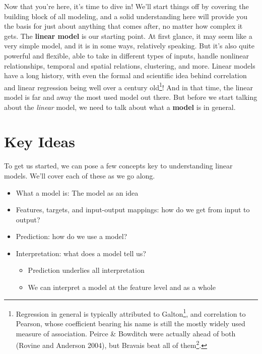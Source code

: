 \documentclass[
  letterpaper,
]{krantz}
\providecommand{\tightlist}{%
  \setlength{\itemsep}{0pt}\setlength{\parskip}{0pt}}\usepackage{longtable,booktabs,array}
\DeclareRobustCommand{\href}[2]{#2\footnote{\url{#1}}}
\begin{document}
Now that you're here, it's time to dive in! We'll start things off by
covering the building block of all modeling, and a solid understanding
here will provide you the basis for just about anything that comes
after, no matter how complex it gets. The \textbf{linear model} is our
starting point. At first glance, it may seem like a very simple model,
and it is in some ways, relatively speaking. But it's also quite
powerful and flexible, able to take in different types of inputs, handle
nonlinear relationships, temporal and spatial relations, clustering, and
more. Linear models have a long history, with even the formal and
scientific idea behind correlation and linear regression being well over
a century old\footnote{Regression in general is typically attributed to
  \href{https://en.wikipedia.org/wiki/Francis_Galton}{Galton}, and
  correlation to Pearson, whose coefficient bearing his name is still
  the mostly widely used measure of association. Peirce \& Bowditch were
  actually ahead of both (Rovine and Anderson 2004), but
  \href{https://en.wikipedia.org/wiki/Auguste_Bravais}{Bravais beat all
  of them}.}! And in that time, the linear model is far and away the
most used model out there. But before we start talking about the
\emph{linear} model, we need to talk about what a \textbf{model} is in
general.

\section{Key Ideas}\label{sec-lm-key-ideas}

To get us started, we can pose a few concepts key to understanding
linear models. We'll cover each of these as we go along.

\begin{itemize}
\tightlist
\item
  What a model is: The model as an idea
\item
  Features, targets, and input-output mappings: how do we get from input
  to output?
\item
  Prediction: how do we use a model?
\item
  Interpretation: what does a model tell us?

  \begin{itemize}
  \tightlist
  \item
    Prediction underlies all interpretation
  \item
    We can interpret a model at the feature level and as a whole
  \end{itemize}
\end{itemize}
\end{document}
